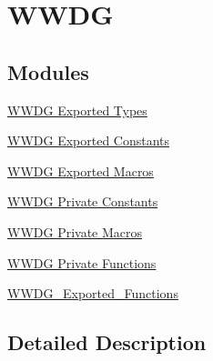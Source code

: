 \hypertarget{group___w_w_d_g}{}\section{W\+W\+DG}
\label{group___w_w_d_g}
\subsection*{Modules}
\begin{DoxyCompactItemize}
\item 
\hyperlink{group___w_w_d_g___exported___types}{W\+W\+D\+G Exported Types}
\item 
\hyperlink{group___w_w_d_g___exported___constants}{W\+W\+D\+G Exported Constants}
\item 
\hyperlink{group___w_w_d_g___exported___macros}{W\+W\+D\+G Exported Macros}
\item 
\hyperlink{group___w_w_d_g___private___constants}{W\+W\+D\+G Private Constants}
\item 
\hyperlink{group___w_w_d_g___private___macros}{W\+W\+D\+G Private Macros}
\item 
\hyperlink{group___w_w_d_g___private___functions}{W\+W\+D\+G Private Functions}
\item 
\hyperlink{group___w_w_d_g___exported___functions}{W\+W\+D\+G\+\_\+\+Exported\+\_\+\+Functions}
\end{DoxyCompactItemize}


\subsection{Detailed Description}
